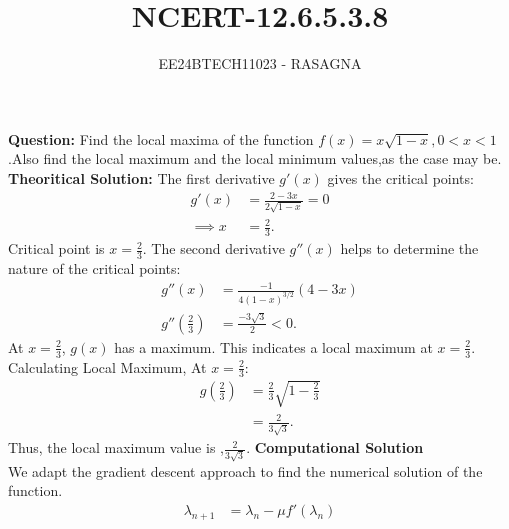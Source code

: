 \documentclass[journal]{IEEEtran}
\begin{document}

\vspace{3cm}

\title{NCERT-12.6.5.3.8}
\author{EE24BTECH11023 - RASAGNA}

{\let\newpage\relax\maketitle}

\renewcommand{\thefigure}{\theenumi}
\renewcommand{\thetable}{\theenumi}
\setlength{\intextsep}{10pt} %


\renewcommand{\thetable}{\theenumi}
\textbf{Question:}
Find the local maxima of the function $f(x)=x{\sqrt{1-x}},0<x<1$.Also find the local maximum and the local minimum values,as the case may be.\\
\textbf{Theoritical Solution:}
The first derivative $g'(x)$ gives the critical points:
\begin{align}
g'(x) &= \frac{2 - 3x}{2\sqrt{1 - x}} = 0 \\
\implies x &= \frac{2}{3}.
\end{align}
Critical point is $x = \frac{2}{3}$.
The second derivative $g''(x)$ helps to determine the nature of the critical points:
\begin{align}
g''(x) &= \frac{-1}{4(1 - x)^{3/2}} \left( 4 - 3x \right) \\
g''\left(\frac{2}{3}\right) &= \frac{-3\sqrt{3}}{2} < 0.
\end{align}
At $x = \frac{2}{3}$, $g(x)$ has a maximum. This indicates a local maximum at $x = \frac{2}{3}$.\\
Calculating Local Maximum,
At $x = \frac{2}{3}$:
\begin{align}
g\left(\frac{2}{3}\right) &= \frac{2}{3} \sqrt{1 - \frac{2}{3}} \\
&= \frac{2}{3\sqrt{3}}.
\end{align}
Thus, the local maximum value is ,${\frac{2}{3\sqrt{3}}}$.
\textbf{Computational Solution}\\
We adapt the gradient descent approach to find the numerical solution of the function.
\begin{align}
\lambda_{n+1} &= \lambda_n -{\mu}f'(\lambda_{n})
\end{align}
\end{document}
